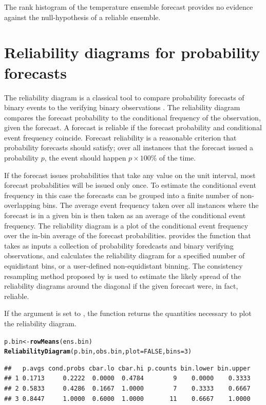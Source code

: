 \documentclass[article]{jss}\usepackage{graphicx, color}
\makeatletter
\newcommand{\hlfunctioncall}[1]{\textcolor[rgb]{0,0.501960784313725,0.752941176470588}{\textbf{#1}}}%
\newenvironment{kframe}{%
 \def\at@end@of@kframe{}%
 \ifinner\ifhmode%
  \def\at@end@of@kframe{\end{minipage}}%
  \begin{minipage}{\columnwidth}%
 \fi\fi%
 \def\FrameCommand##1{\hskip\@totalleftmargin \hskip-\fboxsep
 \colorbox{shadecolor}{##1}\hskip-\fboxsep
     \hskip-\linewidth \hskip-\@totalleftmargin \hskip\columnwidth}%
 \MakeFramed {\advance\hsize-\width
   \@totalleftmargin\z@ \linewidth\hsize
   \@setminipage}}%
 {\par\unskip\endMakeFramed%
 \at@end@of@kframe}
\newenvironment{knitrout}{}{} %
\makeatother
\begin{document}
The rank histogram of the temperature ensemble forecast provides no evidence against the null-hypothesis of a reliable ensemble.

\section{Reliability diagrams for probability forecasts}

The reliability diagram is a classical tool to compare probability forecasts of binary events to the verifying binary observations \citep{jolliffe2012forecast}.
The reliability diagram compares the forecast probability to the conditional frequency of the observation, given the forecast.
A forecast is reliable if the forecast probability and conditional event frequency coincide.
Forecast reliability is a reasonable criterion that probability forecasts should satisfy; over all instances that the forecast issued a probability $p$, the event should happen $p\times 100\%$ of the time.

If the forecast issues probabilities that take any value on the unit interval, most forecast probabilities will be issued only once.
To estimate the conditional event frequency in this case the forecasts can be grouped into a finite number of non-overlapping bins.
The average event frequency taken over all instances where the forecast is in a given bin is then taken as an average of the conditional event frequency.
The reliability diagram is a plot of the conditional event frequency over the in-bin average of the forecast probabilities.
 provides the function  that takes as inputs a collection of probability foredcasts and binary verifying observations, and calculates the reliability diagram for a specified number of equidistant bins, or a user-defined non-equidistant binning.
The consistency resampling method proposed by \citet{broecker2007increasing} is used to estimate the likely spread of the reliability diagrams around the diagonal if the given forecast were, in fact, reliable.


If the  argument is set to , the  function returns the quantities necessary to plot the reliability diagram.

\begin{knitrout}
\color{fgcolor}\begin{kframe}
\begin{alltt}
p.bin <- \hlfunctioncall{rowMeans}(ens.bin)
\hlfunctioncall{ReliabilityDiagram}(p.bin, obs.bin, plot=FALSE, bins=3)
\end{alltt}
\begin{verbatim}
##   p.avgs cond.probs cbar.lo cbar.hi p.counts bin.lower bin.upper
## 1 0.1713     0.2222  0.0000  0.4784        9    0.0000    0.3333
## 2 0.5833     0.4286  0.1667  1.0000        7    0.3333    0.6667
## 3 0.8447     1.0000  0.6000  1.0000       11    0.6667    1.0000
\end{verbatim}
\end{kframe}
\end{knitrout}
\end{document}
